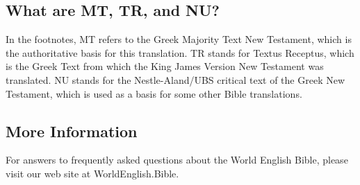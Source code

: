 \hypertarget{what-are-mt-tr-and-nu}{%
\subsection{What are MT, TR, and NU?}\label{what-are-mt-tr-and-nu}}

In the footnotes, MT refers to the Greek Majority Text New Testament,
which is the authoritative basis for this translation. TR stands for
Textus Receptus, which is the Greek Text from which the King James
Version New Testament was translated. NU stands for the Nestle-Aland/UBS
critical text of the Greek New Testament, which is used as a basis for
some other Bible translations.

\hypertarget{more-information}{%
\subsection{More Information}\label{more-information}}

For answers to frequently asked questions about the World English Bible,
please visit our web site at WorldEnglish.Bible.
